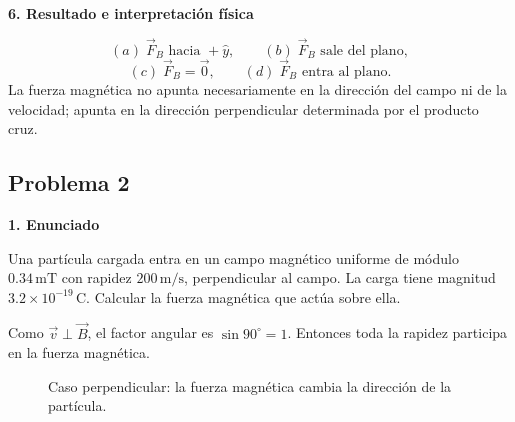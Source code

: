 \documentclass[11pt]{article}
\newcommand{\paso}[1]{%
  \par\medskip
  \noindent\textbf{#1}\par
  \vspace{0.1em}%
}
\newcommand{\Bentra}[2]{%
    \draw[fieldblue,line width=0.55pt] (#1,#2) circle (0.11);
    \draw[fieldblue,line width=0.55pt] ($(#1,#2)+(-0.065,-0.065)$)--($(#1,#2)+(0.065,0.065)$);
    \draw[fieldblue,line width=0.55pt] ($(#1,#2)+(-0.065,0.065)$)--($(#1,#2)+(0.065,-0.065)$);
}
\begin{document}
\paso{6. Resultado e interpretaci\'on f\'isica}
\begin{equation*}
    \boxed{(a)\;\vec F_B\text{ hacia }+\hat y},
    \qquad
    \boxed{(b)\;\vec F_B\text{ sale del plano}},
\end{equation*}
\begin{equation*}
    \boxed{(c)\;\vec F_B=\vec0},
    \qquad
    \boxed{(d)\;\vec F_B\text{ entra al plano}}.
\end{equation*}
La fuerza magn\'etica no apunta necesariamente en la direcci\'on del campo ni de la velocidad; apunta en la direcci\'on perpendicular determinada por el producto cruz.

\newpage

\subsection*{Problema 2}
\paso{1. Enunciado}
Una part\'icula cargada entra en un campo magn\'etico uniforme de m\'odulo $0.34\,\mathrm{mT}$ con rapidez $200\,\mathrm{m/s}$, perpendicular al campo. La carga tiene magnitud $3.2\times10^{-19}\,\mathrm C$. Calcular la fuerza magn\'etica que act\'ua sobre ella.

\begin{comentario}
Como $\vec v\perp\vec B$, el factor angular es $\sin90^\circ=1$. Entonces toda la rapidez participa en la fuerza magn\'etica.
\end{comentario}

\begin{figure}[h!]
\centering
{}
\caption{Caso perpendicular: la fuerza magn\'etica cambia la direcci\'on de la part\'icula.}
\end{figure}
\end{document}
